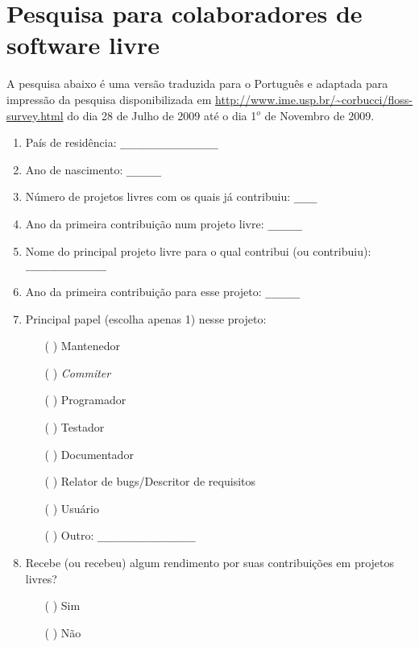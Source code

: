 \chapter{Pesquisa para colaboradores de software livre}
\label{ape:OS}

\singlespacing

A pesquisa abaixo é uma versão traduzida para o Português e adaptada
para impressão da pesquisa disponibilizada em
\url{http://www.ime.usp.br/~corbucci/floss-survey.html} do dia 28 de
Julho de 2009 até o dia 1$^o$ de Novembro de 2009.

\begin{enumerate}
\item País de residência: \verb=_________________=

\item Ano de nascimento: \verb=______=

\item Número de projetos livres com os quais já contribuiu:
  \verb=____=

\item Ano da primeira contribuição num projeto livre: \verb=______=

\item Nome do principal projeto livre para o qual contribui (ou
  contribuiu): \verb= ______________=

\item Ano da primeira contribuição para esse projeto: \verb=______=

\item Principal papel (escolha apenas 1) nesse projeto:
  \begin{itemize}
  \item[( )] Mantenedor
  \item[( )] \textit{Commiter}
  \item[( )] Programador
  \item[( )] Testador
  \item[( )] Documentador
  \item[( )] Relator de bugs/Descritor de requisitos
  \item[( )] Usuário
  \item[( )] Outro: \verb=_________________=
  \end{itemize}

\item Recebe (ou recebeu) algum rendimento por suas contribuições em
  projetos livres?
  \begin{itemize}
  \item[( )] Sim
  \item[( )] Não
  \end{itemize}


\end{enumerate}
